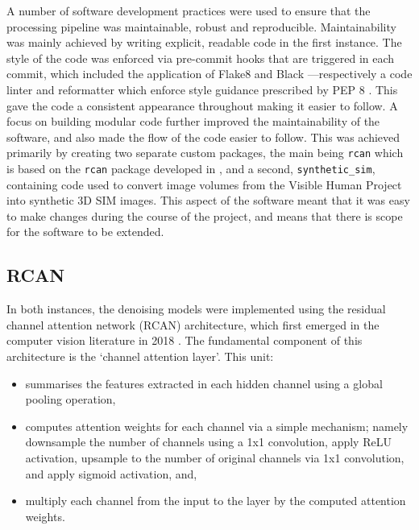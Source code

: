 \documentclass[12pt]{article}
\begin{document}
A number of software development practices were used to ensure that the processing pipeline was maintainable, robust and reproducible.
Maintainability was mainly achieved by writing explicit, readable code in the first instance.
The style of the code was enforced via pre-commit hooks that are triggered in each commit,
which included the application of Flake8 \cite{flake8} and Black \cite{black}---respectively a code linter and reformatter which enforce style guidance prescribed by PEP 8 \cite{pep8}.
This gave the code a consistent appearance throughout making it easier to follow.
A focus on building modular code further improved the maintainability of the software,
and also made the flow of the code easier to follow.
This was achieved primarily by creating two separate custom packages,
the main being \texttt{rcan} which is based on the \texttt{rcan} package developed in \cite{rcan2021},
and a second, \texttt{synthetic\_sim}, containing code used to convert image volumes from the Visible Human Project into synthetic 3D SIM images.
This aspect of the software meant that it was easy to make changes during the course of the project,
and means that there is scope for the software to be extended.

\subsection{RCAN}

In both instances, the denoising models were implemented using the residual channel attention network (RCAN) architecture,
which first emerged in the computer vision literature in 2018 \cite{rcan2018}.
The fundamental component of this architecture is the `channel attention layer'.
This unit:

\begin{itemize}
    \item summarises the features extracted in each hidden channel using a global pooling operation,
    \item computes attention weights for each channel via a simple mechanism;
    namely downsample the number of channels using a 1x1 convolution,
    apply ReLU activation,
    upsample to the number of original channels via 1x1 convolution,
    and apply sigmoid activation, and,
    \item multiply each channel from the input to the layer by the computed attention weights.
\end{itemize}
\end{document}
